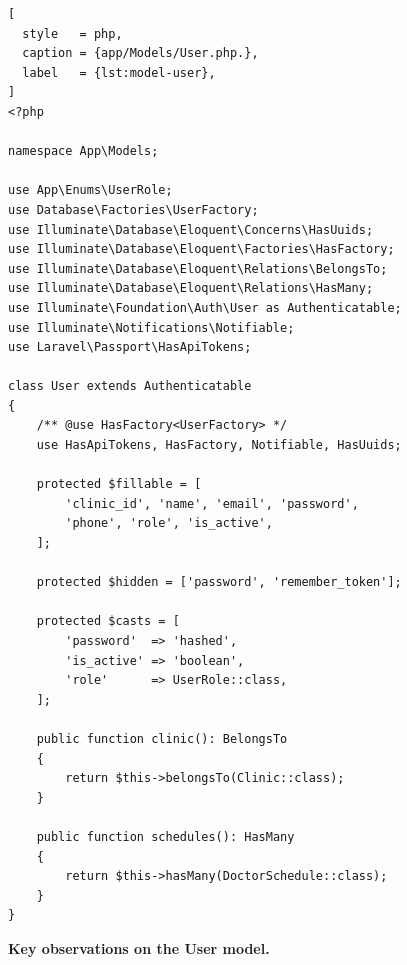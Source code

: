 \begin{lstlisting}[
  style   = php,
  caption = {app/Models/User.php.},
  label   = {lst:model-user},
]
<?php

namespace App\Models;

use App\Enums\UserRole;
use Database\Factories\UserFactory;
use Illuminate\Database\Eloquent\Concerns\HasUuids;
use Illuminate\Database\Eloquent\Factories\HasFactory;
use Illuminate\Database\Eloquent\Relations\BelongsTo;
use Illuminate\Database\Eloquent\Relations\HasMany;
use Illuminate\Foundation\Auth\User as Authenticatable;
use Illuminate\Notifications\Notifiable;
use Laravel\Passport\HasApiTokens;

class User extends Authenticatable
{
    /** @use HasFactory<UserFactory> */
    use HasApiTokens, HasFactory, Notifiable, HasUuids;

    protected $fillable = [
        'clinic_id', 'name', 'email', 'password',
        'phone', 'role', 'is_active',
    ];

    protected $hidden = ['password', 'remember_token'];

    protected $casts = [
        'password'  => 'hashed',
        'is_active' => 'boolean',
        'role'      => UserRole::class,
    ];

    public function clinic(): BelongsTo
    {
        return $this->belongsTo(Clinic::class);
    }

    public function schedules(): HasMany
    {
        return $this->hasMany(DoctorSchedule::class);
    }
}
\end{lstlisting}

\textbf{Key observations on the User model.}

